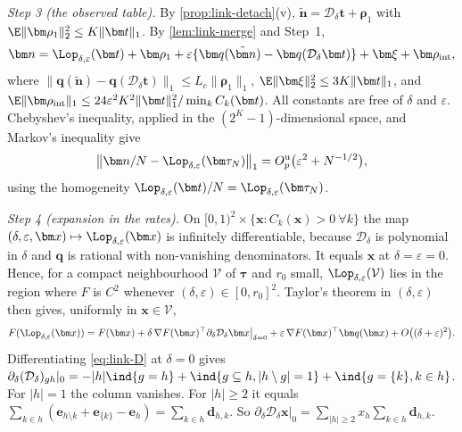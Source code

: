 \emph{Step 3 (the observed table).} By \cref{prop:link-detach}(v), $\tilde{\bm n}=\mathcal D_\delta\bm t+\bm\rho_1$ with $\E\|\bm\rho_1\|_2^2\le K\|\bm t\|_1$. By \cref{lem:link-merge} and Step~1,
\[
  \bm n=\Lop_{\delta,\varepsilon}(\bm t)+\bm\rho_1+\varepsilon\{\bm q(\tilde{\bm n})-\bm q(\mathcal D_\delta\bm t)\}+\bm\xi+\bm\rho_{\mathrm{int}},
\]
where $\|\bm q(\tilde{\bm n})-\bm q(\mathcal D_\delta\bm t)\|_1\le L_c\|\bm\rho_1\|_1$, $\E\|\bm\xi\|_2^2\le3K\|\bm t\|_1$, and $\E\|\bm\rho_{\mathrm{int}}\|_1\le24\varepsilon^2K^2\|\bm t\|_1^2/\min_kC_k(\bm t)$. All constants are free of $\delta$ and $\varepsilon$. Chebyshev's inequality, applied in the $(2^K-1)$-dimensional space, and Markov's inequality give
\begin{equation}\label{eq:link-nexp}
  \bigl\|\bm n/N-\Lop_{\delta,\varepsilon}(\bm\tau_N)\bigr\|_1=O_p^{\mathrm u}\bigl(\varepsilon^2+N^{-1/2}\bigr),
\end{equation}
using the homogeneity $\Lop_{\delta,\varepsilon}(\bm t)/N=\Lop_{\delta,\varepsilon}(\bm\tau_N)$.

\emph{Step 4 (expansion in the rates).} On $[0,1)^2\times\{\bm x:C_k(\bm x)>0\ \forall k\}$ the map $(\delta,\varepsilon,\bm x)\mapsto\Lop_{\delta,\varepsilon}(\bm x)$ is infinitely differentiable, because $\mathcal D_\delta$ is polynomial in $\delta$ and $\bm q$ is rational with non-vanishing denominators. It equals $\bm x$ at $\delta=\varepsilon=0$. Hence, for a compact neighbourhood $\mathcal V$ of $\bm\tau$ and $r_0$ small, $\Lop_{\delta,\varepsilon}(\mathcal V)$ lies in the region where $F$ is $C^2$ whenever $(\delta,\varepsilon)\in[0,r_0]^2$. Taylor's theorem in $(\delta,\varepsilon)$ then gives, uniformly in $\bm x\in\mathcal V$,
\[
  F(\Lop_{\delta,\varepsilon}(\bm x))=F(\bm x)+\delta\,\nabla F(\bm x)^{\top}\partial_\delta\mathcal D_\delta\bm x\big|_{\delta=0}+\varepsilon\,\nabla F(\bm x)^{\top}\bm q(\bm x)+O\bigl((\delta+\varepsilon)^2\bigr).
\]
Differentiating \eqref{eq:link-D} at $\delta=0$ gives $\partial_\delta(\mathcal D_\delta)_{gh}|_0=-|h|\ind{g=h}+\ind{g\subseteq h,|h\setminus g|=1}+\ind{g=\{k\},k\in h}$. For $|h|=1$ the column vanishes. For $|h|\ge2$ it equals $\sum_{k\in h}(\bm e_{h\setminus k}+\bm e_{\{k\}}-\bm e_h)=\sum_{k\in h}\bm d_{h,k}$. So $\partial_\delta\mathcal D_\delta\bm x|_0=\sum_{|h|\ge2}x_h\sum_{k\in h}\bm d_{h,k}$.

